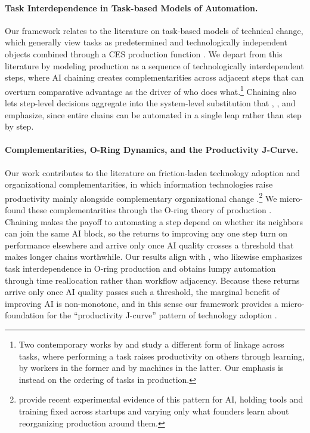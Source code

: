\paragraph{Task Interdependence in Task-based Models of Automation.}
Our framework relates to the literature on task-based models of technical change, which generally view tasks as predetermined and technologically independent objects combined through a CES production function \citep{acemoglu2011skills, acemoglu2018, acemoglu2019automation, acemoglu2024tasks}.
We depart from this literature by modeling production as a sequence of technologically interdependent steps, where AI chaining creates complementarities across adjacent steps that can overturn comparative advantage as the driver of who does what.\footnote{Two contemporary works by \cite{trammell2026workflows} and \cite{farboodi2026data} study a different form of linkage across tasks, where performing a task raises productivity on others through learning, by workers in the former and by machines in the latter. Our emphasis is instead on the ordering of tasks in production.}
Chaining also lets step-level decisions aggregate into the system-level substitution that \cite{autor2003skill}, \cite{acemoglu2019automation}, and \cite{bresnahan2002information} emphasize, since entire chains can be automated in a single leap rather than step by step.


\paragraph{Complementarities, O-Ring Dynamics, and the Productivity J-Curve.}
Our work contributes to the literature on friction-laden technology adoption and organizational complementarities, in which information technologies raise productivity mainly alongside complementary organizational change \citep{bresnahan2002information, bloom2016management}.\footnote{\citet{kim2026mapping} provide recent experimental evidence of this pattern for AI, holding tools and training fixed across startups and varying only what founders learn about reorganizing production around them.}
We micro-found these complementarities through the O-ring theory of production \citep{kremer1993oring}. Chaining makes the payoff to automating a step depend on whether its neighbors can join the same AI block, so the returns to improving any one step turn on performance elsewhere and arrive only once AI quality crosses a threshold that makes longer chains worthwhile.
Our results align with \citet{gans2026oring}, who likewise emphasizes task interdependence in O-ring production and obtains lumpy automation through time reallocation rather than workflow adjacency.
Because these returns arrive only once AI quality passes such a threshold, the marginal benefit of improving AI is non-monotone, and in this sense our framework provides a micro-foundation for the ``productivity J-curve'' pattern of technology adoption \citep{brynjolfsson2021productivity, mcelheran2025rise, furman2019ai, tambe2012productivity, mcelheran2024adoption}.


